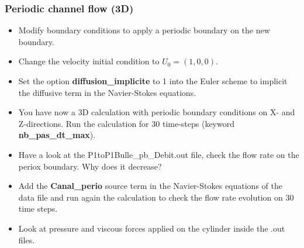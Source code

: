 \documentclass[10pt, hyperref={unicode=true,pdfusetitle, bookmarks=true,bookmarksnumbered=false,bookmarksopen=false, breaklinks=false,pdfborder={0 0l 1},backref=true,colorlinks=true,linkcolor=darkblue,pageanchor}]{beamer}
\begin{document}
\begin{frame}
\frametitle{Periodic channel flow (3D)}
\begin{block}{}

\begin{itemize}
\item Modify boundary conditions to apply a periodic boundary on the new boundary. 

\item Change the velocity initial condition to $U_0=(1,0,0)$. 

\item Set the option \textbf{diffusion\_implicite} to 1 into the Euler scheme to implicit the diffusive term in the Navier-Stokes equations.

\item You have now a 3D calculation with periodic boundary conditions on X- and Z-directions. Run the calculation for 30 time-steps (keyword \textbf{nb\_pas\_dt\_max}).

\item Have a look at the P1toP1Bulle\_pb\_Debit.out file, check the flow rate on the periox boundary. Why does it decrease?

\item Add the \textbf{Canal\_perio} source term in the Navier-Stokes equations of the data file and run again the calculation to check the flow rate evolution on 30 time steps. 

\item Look at pressure and viscous forces applied on the cylinder inside the .out files.
\end{itemize}

\end{block}
\end{frame}
\end{document}
